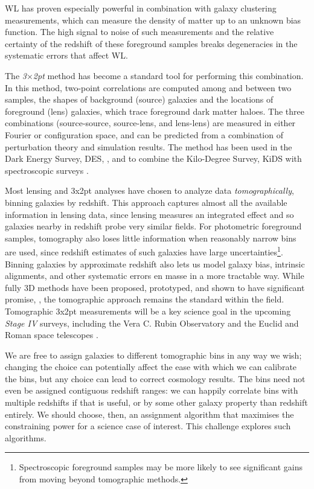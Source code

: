 \documentclass[twocolumn,twocolappendix]{aastex63}
\begin{document}
WL has proven especially powerful in combination with galaxy clustering measurements,
which can measure the density of matter up to an unknown bias function.  The high signal
to noise of such measurements and the relative certainty of the redshift of these foreground
samples breaks degeneracies in the systematic errors that affect WL.

The \emph{3$\times$2pt} method has become a standard tool for performing this combination.
In this method, two-point correlations are computed among and between two samples, the shapes of 
background (source) galaxies and the locations of foreground (lens) galaxies, which trace foreground
dark matter haloes.  The three combinations (source-source, source-lens, and lens-lens) are
measured in either Fourier or configuration space, and can be predicted from a combination of 
perturbation theory and simulation results.  The method has been used in the Dark Energy Survey, DES, 
\citep{des-3x2pt, desy3-3x2pt}, and to combine the Kilo-Degree 
Survey, KiDS with spectroscopic surveys \citep{kids-3x2pt, kids_gama, kids_2df}.

Most lensing and 3x2pt analyses have chosen to analyze data \emph{tomographically}, 
binning galaxies by redshift.
This approach captures almost all the available information in lensing data, since lensing measures
an integrated effect and so galaxies nearby in redshift probe very similar fields.  For photometric
foreground samples, tomography also loses little information when reasonably narrow bins are used,
since redshift estimates of such galaxies have
large uncertainties\footnote{Spectroscopic foreground samples may be more likely to see significant 
gains from moving beyond tomographic methods.}.  Binning galaxies by approximate redshift also lets us 
model galaxy bias, intrinsic alignments, and other systematic errors en masse in a more tractable way.
While fully 3D methods have been proposed, prototyped, and shown to have significant promise, 
\citep{heavens,kitching}, the tomographic approach remains the standard within the field.
Tomographic 3x2pt measurements will be a key science goal in the upcoming \emph{Stage IV} surveys,
including the Vera C. Rubin Observatory \citep{rubin} and the Euclid and Roman space telescopes
\citep{euclid,roman}.

We are free to assign galaxies to different tomographic bins in any way we wish; changing the choice
can potentially affect the ease with which we can calibrate
the bins, but any choice can lead to correct cosmology results. The bins need not even be assigned contiguous redshift ranges: we can happily correlate bins with multiple redshifts if that is useful, or by some other galaxy property than redshift entirely.
We should choose, then, an assignment algorithm that maximises the constraining power for a science
case of interest.  This challenge explores such algorithms.
\end{document}
